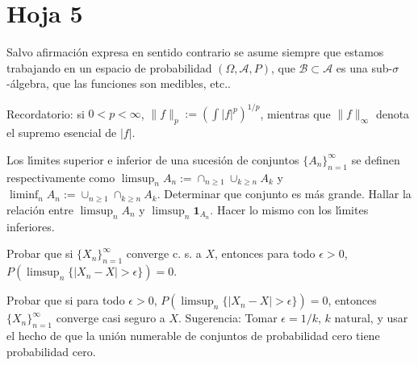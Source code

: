 

\newpage
\section{Hoja 5}

Salvo afirmaci\'on expresa en sentido
contrario se asume siempre que estamos trabajando en un espacio de probabilidad $(\Omega, \mathcal{A}, P)$,
que  $\mathcal{B}\subset \mathcal{A}$ es una sub-$\sigma$-\'algebra, que las funciones son medibles, etc..

Recordatorio: si $0 < p < \infty$, $\|f\|_p := \left(\int|f|^p\right)^{1/p}$, mientras que
$\|f\|_\infty$ denota el supremo esencial de $|f|$. 

\begin{problem}[1] Los l\'{\i}mites superior e inferior de una sucesi\'on de conjuntos  $\{A_n\}_{n=1}^{\infty}  $ se
definen respectivamente como $\limsup_n A_n := \cap_{n\ge 1 } \cup_{k\ge n } A_k$ y 
$\liminf_n A_n := \cup_{n\ge 1 } \cap_{k\ge n } A_k$. Determinar que conjunto es m\'as grande.
Hallar la relaci\'on entre  $\limsup_n A_n$ y  $\limsup_n \mathbf{1}_{ A_n}$. Hacer lo mismo con los
 l\'{\i}mites inferiores.
\solution

\begin{expla}

\end{expla}

\end{problem}


\begin{problem}[2] Probar que si $\{X_n\}_{n=1}^{\infty}$  converge c. s. a $X$, entonces para todo $\epsilon > 0$,
$P(\limsup_n\{ |X_n - X| > \epsilon\}) = 0$.
\solution

\begin{expla}

\end{expla}

\end{problem}


\begin{problem}[3] Probar que si para todo $\epsilon > 0$,
$P(\limsup_n\{ |X_n - X| > \epsilon\}) = 0$, entonces  $\{X_n\}_{n=1}^{\infty}$  converge casi seguro a $X$.
Sugerencia: Tomar $\epsilon = 1/k$, $k$ natural, y usar el hecho de que la uni\'on numerable de conjuntos
de probabilidad cero tiene probabilidad cero.
\solution

\begin{expla}

\end{expla}

\end{problem}

